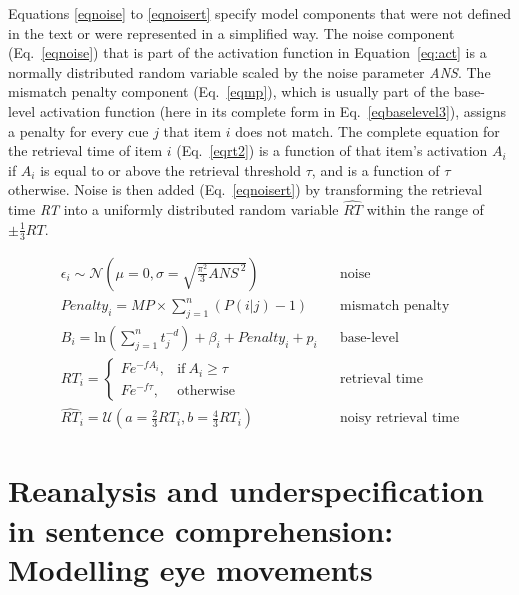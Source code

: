 \documentclass{cambridge7A}\usepackage[]{graphicx}\usepackage[]{color}
\begin{document}
\begin{subappendices}
Equations \ref{eqnoise} to \ref{eqnoisert} specify model components that were not defined in the text or were represented in a simplified way.
The noise component (Eq.~\ref{eqnoise}) that is part of the activation function in Equation~\ref{eq:act} is a normally distributed random variable scaled by the noise parameter \textit{ANS}.
The mismatch penalty component (Eq.~\ref{eqmp}), which is usually part of the base-level activation function (here in its complete form in Eq.~\ref{eqbaselevel3}), assigns a penalty for every cue $j$ that item $i$ does not match.
The complete equation for the retrieval time of item $i$ (Eq.~\ref{eqrt2}) is a function of that item's activation $A_i$ if $A_i$ is equal to or above the retrieval threshold $\tau$, and is a function of $\tau$ otherwise.
Noise is then added (Eq.~\ref{eqnoisert}) by transforming the retrieval time \textit{RT} into a uniformly distributed random variable $\widehat{\textit{RT}}$ within the range of $\pm\frac{1}{3}\textit{RT}$.

\begin{eqnarray}
  \epsilon_i \sim \mathcal{N}(\mu = 0, \sigma = \sqrt{\frac{\pi^2}{3} \textit{ANS}^{\ 2}}) && \text{noise} \label{eqnoise} \\
	\textit{Penalty}_i = \textit{MP} \times \sum_{j=1}^n (P(i|j)-1) && \text{mismatch penalty} \label{eqmp} \\
  B_i = \text{ln}(\sum_{j=1}^n t_j^{-d}) + \beta_i + \textit{Penalty}_i + p_i  && \text{base-level} \label{eqbaselevel3} \\
  \textit{RT}_i = 
		\begin{cases}
      Fe^{-fA_i}, & \text{if}\ A_i \geq \tau \\
      Fe^{-f\tau}, & \text{otherwise}
    \end{cases}  && \text{retrieval time} \label{eqrt2} \\
  \widehat{\textit{RT}}_i = \mathcal{U}(a = \frac{2}{3} \textit{RT}_i, b = \frac{4}{3} \textit{RT}_i) && \text{noisy retrieval time} \label{eqnoisert}
\end{eqnarray}

\end{subappendices}




\chapter[Reanalysis and underspecification]{Reanalysis and underspecification in sentence comprehension: Modelling eye movements} \label{c04}
\end{document}
